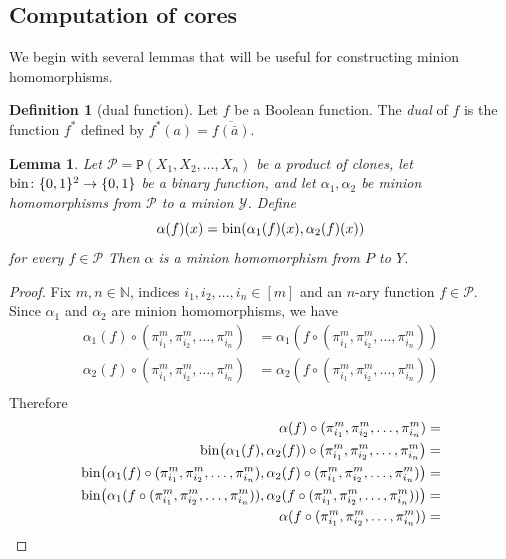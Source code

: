 \documentclass{amsart}
\numberwithin{equation}{section}
\theoremstyle{plain}
\newtheorem{lemma}[theorem]{Lemma}
\theoremstyle{definition}
\newtheorem{definition}[theorem]{Definition}
\def\clone#1{\mathcal{#1}}
\def\minion#1{\mathcal{#1}}
\def\C#1{{\mathtt{P}}(#1)}
\begin{document}
\subsection{Computation of cores}

We begin with several lemmas that will be useful for constructing minion homomorphisms.

\begin{definition}[dual function] 
Let $f$ be a Boolean function. The {\em dual} of $f$ is the function $f^*$ defined by $f^*(a) = \overline{f(\bar{a})}$.
\end{definition}


\begin{lemma}
  \label{binary-minion-homomorphism}
  Let $\clone{P} = \C{X_1,X_2,\dots,X_n}$ be a product of clones, let $\rm bin\colon \{0,1\}^2\to\{0,1\}$ be a binary function, and let $\alpha_1,\alpha_2$ be minion homomorphisms from $\clone{P}$ to a minion $\minion{Y}$.
  Define
  $$\alpha(f)(x) ={\rm bin}(\alpha_1(f)(x), \alpha_2(f)(x))$$
  for every $f\in\clone{P}$
  Then $\alpha$ is a minion homomorphism from $P$ to $Y$.
\end{lemma}
\begin{proof}
  Fix $m,n\in\mathbb N$, indices $i_1,i_2,\dots,i_n\in[m]$ and an $n$-ary function $f\in\clone{P}$. Since $\alpha_1$ and $\alpha_2$ are minion homomorphisms, we have
\begin{align*}
  \alpha_1(f)\circ(\pi_{i_1}^m,\pi_{i_2}^m,\dots,\pi_{i_n}^m) &= \alpha_1(f\circ(\pi_{i_1}^m,\pi_{i_2}^m,\dots,\pi_{i_n}^m)) \\
  \alpha_2(f)\circ(\pi_{i_1}^m,\pi_{i_2}^m,\dots,\pi_{i_n}^m) &= \alpha_2(f\circ(\pi_{i_1}^m,\pi_{i_2}^m,\dots,\pi_{i_n}^m)) \\
\end{align*}
Therefore
\begin{align*}
  \alpha(f)\circ(\pi_{i_1}^m,\pi_{i_2}^m,\dots,\pi_{i_n}^m) &= \\
        {\rm bin}\big(\alpha_1(f),\alpha_2(f))\circ( \pi_{i_1}^m,\pi_{i_2}^m,\dots,\pi_{i_n}^m\big) &= \\
        {\rm bin}\big(\alpha_1(f) \circ( \pi_{i_1}^m,\pi_{i_2}^m,\dots,\pi_{i_n}^m),\alpha_2(f) \circ( \pi_{i_1}^m,\pi_{i_2}^m,\dots,\pi_{i_n}^m)\big) &= \\
        {\rm bin}\big(\alpha_1(f \circ( \pi_{i_1}^m,\pi_{i_2}^m,\dots,\pi_{i_n}^m)),\alpha_2(f \circ( \pi_{i_1}^m,\pi_{i_2}^m,\dots,\pi_{i_n}^m))\big) &= \\
        \alpha(f \circ(\pi_{i_1}^m,\pi_{i_2}^m,\dots,\pi_{i_n}^m)) &= \\
\end{align*}
\end{proof}
\end{document}
